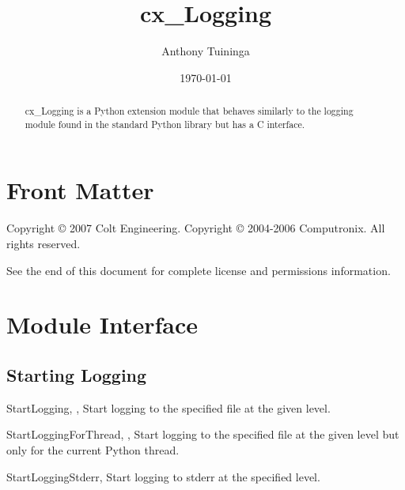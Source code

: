 \documentclass{manual}
\title{cx\_Logging}
\author{Anthony Tuininga}
\date{\today}                   %
\begin{document}
\maketitle

\ifhtml
\chapter*{Front Matter\label{front}}
\fi

Copyright \copyright{} 2007 Colt Engineering.\break
Copyright \copyright{} 2004-2006 Computronix.
All rights reserved.

See the end of this document for complete license and permissions
information.

\begin{abstract}

\noindent
cx\_Logging is a Python extension module that behaves similarly to the logging
module found in the standard Python library but has a C interface.

\end{abstract}

\tableofcontents

\chapter{Module Interface\label{module}}

\section{Starting Logging \label{pyStartLogging}}

\begin{funcdesc}{StartLogging}{, ,
    }
  Start logging to the specified file at the given level.
\end{funcdesc}

\begin{funcdesc}{StartLoggingForThread}{, ,
    }
  Start logging to the specified file at the given level but only for the
  current Python thread.
\end{funcdesc}

\begin{funcdesc}{StartLoggingStderr}{, }
  Start logging to stderr at the specified level.
\end{funcdesc}
\end{document}
